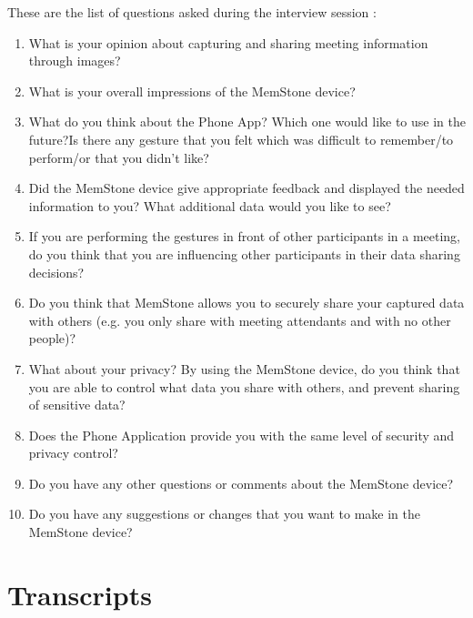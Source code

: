 \documentclass[mscthesis]{usiinfthesis}
\begin{document}
These are the list of questions asked during the interview session : 
\begin{enumerate}
\item What is your opinion about capturing and sharing meeting information through images?
\item What is your overall impressions of the MemStone device?
\item What do you think about the Phone App? Which one would like to use in the future?Is there any gesture that you felt which was difficult to remember/to perform/or that you didn't like?
\item Did the MemStone device give appropriate feedback and displayed the needed information to you? What additional data would you like to see?
\item If you are performing the gestures in front of other participants in a meeting, do you think that you are influencing other participants in their data sharing decisions?
\item Do you think that MemStone allows you to securely share your captured data with others (e.g. you only share with meeting attendants and with no other people)?
\item What about your privacy? By using the MemStone device, do you think that you are able to control what data you share with others, and prevent sharing of sensitive data?
\item Does the Phone Application provide you with the same level of security and privacy control?
\item Do you have any other questions or comments about the MemStone device?
\item Do you have any suggestions or changes that you want to make in the MemStone device?
\end{enumerate}

\chapter{Transcripts}


\label{mem:trans}



\label{mem:mt}


\backmatter

%
%



\end{document}
